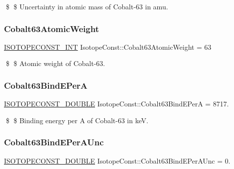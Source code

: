 \$ \$ Uncertainty in atomic mass of Cobalt-\/63 in amu. \mbox{\label{group___isotope_const-_cobalt-_co63_ga9ddb8d67133d567dfda1235e64c0e6cd}} 
\subsubsection{\texorpdfstring{Cobalt63\+Atomic\+Weight}{Cobalt63AtomicWeight}}
{\footnotesize\ttfamily \mbox{\hyperlink{group___isotope_const-_macros_ga5f18360b3e99483a35c32d789e62621c}{I\+S\+O\+T\+O\+P\+E\+C\+O\+N\+S\+T\+\_\+\+I\+NT}} Isotope\+Const\+::\+Cobalt63\+Atomic\+Weight = 63}

\$ \$ Atomic weight of Cobalt-\/63. \mbox{\label{group___isotope_const-_cobalt-_co63_gabdc7581f9dd0799ea5b3fbad3abfb58a}} 
\subsubsection{\texorpdfstring{Cobalt63\+Bind\+E\+PerA}{Cobalt63BindEPerA}}
{\footnotesize\ttfamily \mbox{\hyperlink{group___isotope_const-_macros_ga8f45a7272ce02c0b4c65c44636ed719a}{I\+S\+O\+T\+O\+P\+E\+C\+O\+N\+S\+T\+\_\+\+D\+O\+U\+B\+LE}} Isotope\+Const\+::\+Cobalt63\+Bind\+E\+PerA = 8717.}

\$ \$ Binding energy per A of Cobalt-\/63 in keV. \mbox{\label{group___isotope_const-_cobalt-_co63_ga51bc128c4b1ef55616e50c8d86c7003c}} 
\subsubsection{\texorpdfstring{Cobalt63\+Bind\+E\+Per\+A\+Unc}{Cobalt63BindEPerAUnc}}
{\footnotesize\ttfamily \mbox{\hyperlink{group___isotope_const-_macros_ga8f45a7272ce02c0b4c65c44636ed719a}{I\+S\+O\+T\+O\+P\+E\+C\+O\+N\+S\+T\+\_\+\+D\+O\+U\+B\+LE}} Isotope\+Const\+::\+Cobalt63\+Bind\+E\+Per\+A\+Unc = 0.}

